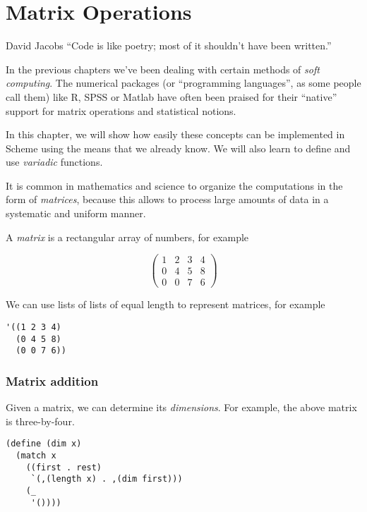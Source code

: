 
\chapter{Matrix Operations}

\begin{chapquote}{David Jacobs}
``Code is like poetry; most of it shouldn't have been written.''
\end{chapquote}

In the previous chapters we've been dealing with certain methods
of \textit{soft computing}. The numerical packages (or ``programming
languages'', as some people call them) like R, SPSS or Matlab
have often been praised for their ``native'' support for matrix
operations and statistical notions.

In this chapter, we will show how easily these concepts can be
implemented in Scheme using the means that we already know. We will
also learn to define and use \textit{variadic} functions.

It is common in mathematics and science to organize the computations
in the form of \textit{matrices}, because this allows to process
large amounts of data in a systematic and uniform manner.

A \textit{matrix} is a rectangular array of numbers, for example

\begin{equation*}
  \begin{pmatrix}
    1 & 2 & 3 & 4 \\
    0 & 4 & 5 & 8 \\
    0 & 0 & 7 & 6
  \end{pmatrix}
\end{equation*}

We can use lists of lists of equal length to represent matrices,
for example

\begin{Verbatim}[samepage=true]
'((1 2 3 4)
  (0 4 5 8)
  (0 0 7 6))
\end{Verbatim}

\subsection{Matrix addition}

Given a matrix, we can determine its \textit{dimensions}.
For example, the above matrix is three-by-four.

\begin{Verbatim}[samepage=true]
(define (dim x)
  (match x
    ((first . rest)
     `(,(length x) . ,(dim first)))
    (_ 
     '())))
\end{Verbatim}

